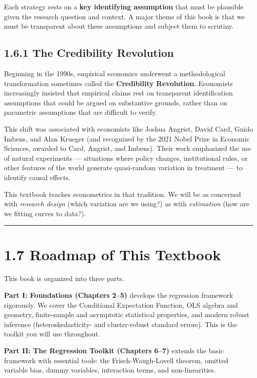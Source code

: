 Each strategy rests on a \textbf{key identifying assumption} that must be plausible given the research question and context. A major theme of this book is that we must be transparent about these assumptions and subject them to scrutiny.

\subsection{1.6.1 The Credibility Revolution}

Beginning in the 1990s, empirical economics underwent a methodological transformation sometimes called the \textbf{Credibility Revolution}. Economists increasingly insisted that empirical claims rest on transparent identification assumptions that could be argued on substantive grounds, rather than on parametric assumptions that are difficult to verify.

This shift was associated with economists like Joshua Angrist, David Card, Guido Imbens, and Alan Krueger (and recognized by the 2021 Nobel Prize in Economic Sciences, awarded to Card, Angrist, and Imbens). Their work emphasized the use of natural experiments --- situations where policy changes, institutional rules, or other features of the world generate quasi-random variation in treatment --- to identify causal effects.

This textbook teaches econometrics in that tradition. We will be as concerned with \textit{research design} (which variation are we using?) as with \textit{estimation} (how are we fitting curves to data?).

\medskip\hrule\medskip

\section{1.7 Roadmap of This Textbook}

This book is organized into three parts.

\textbf{Part I: Foundations (Chapters 2--5)} develops the regression framework rigorously. We cover the Conditional Expectation Function, OLS algebra and geometry, finite-sample and asymptotic statistical properties, and modern robust inference (heteroskedasticity- and cluster-robust standard errors). This is the toolkit you will use throughout.

\textbf{Part II: The Regression Toolkit (Chapters 6--7)} extends the basic framework with essential tools: the Frisch-Waugh-Lovell theorem, omitted variable bias, dummy variables, interaction terms, and non-linearities.

